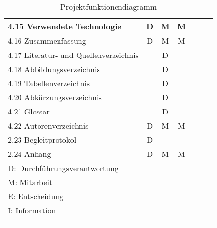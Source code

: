 \begin{longtable}{|l|c|c|c|c|c|c|}
  4.15 Verwendete Technologie            & D              & M           & M          &          &               &               \\ \hline
  4.16 Zusammenfassung                   & D              & M           & M          &          &               &               \\ \hline
  4.17 Literatur- und Quellenverzeichnis &                & D           &            &          &               &               \\ \hline
  4.18 Abbildungsverzeichnis             &                & D           &            &          &               &               \\ \hline
  4.19 Tabellenverzeichnis               &                & D           &            &          &               &               \\ \hline
  4.20 Abkürzungsverzeichnis             &                & D           &            &          &               &               \\ \hline
  4.21 Glossar                           &                & D           &            &          &               &               \\ \hline
  4.22 Autorenverzeichnis                & D              & M           & M          &          &               &               \\ \hline
  2.23 Begleitprotokol                   & D              &             &            &          &               &               \\ \hline
  2.24 Anhang                            & D              & M           & M          &          &               &               \\ \hline

  \multicolumn{7}{|l|}{D: Durchführungsverantwortung}                                                                           \\
  \multicolumn{7}{|l|}{M: Mitarbeit}                                                                                            \\
  \multicolumn{7}{|l|}{E: Entscheidung}                                                                                         \\
  \multicolumn{7}{|l|}{I: Information}                                                                                          \\ \hline

  \multicolumn{7}{c}{}                                                                                                          \\

  \caption{Projektfunktionendiagramm}
  \label{tab:projektfunktionendiagramm}
\end{longtable}